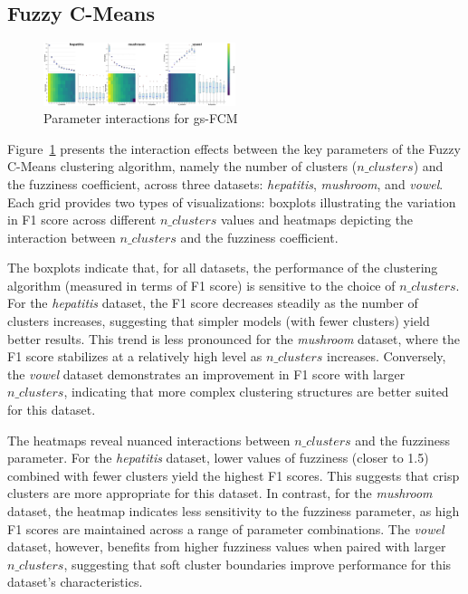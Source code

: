 \subsection{Fuzzy C-Means}
\label{subsec:fuzzycmeansresults}

\begin{figure}[ht!]
    \includegraphics[width=0.5\textwidth]{figures/interactions_fuzzy_cmeans.png}
    \caption{Parameter interactions for gs-FCM}
    \label{fig:interactions_gsfcm}
\end{figure}


Figure~\ref{fig:interactions_gsfcm} presents the interaction effects between the key parameters of the Fuzzy C-Means clustering algorithm, namely the number of clusters ($n\_clusters$) and the fuzziness coefficient, across three datasets: \textit{hepatitis}, \textit{mushroom}, and \textit{vowel}. Each grid provides two types of visualizations: boxplots illustrating the variation in F1 score across different $n\_clusters$ values and heatmaps depicting the interaction between $n\_clusters$ and the fuzziness coefficient.

The boxplots indicate that, for all datasets, the performance of the clustering algorithm (measured in terms of F1 score) is sensitive to the choice of $n\_clusters$. For the \textit{hepatitis} dataset, the F1 score decreases steadily as the number of clusters increases, suggesting that simpler models (with fewer clusters) yield better results. This trend is less pronounced for the \textit{mushroom} dataset, where the F1 score stabilizes at a relatively high level as $n\_clusters$ increases. Conversely, the \textit{vowel} dataset demonstrates an improvement in F1 score with larger $n\_clusters$, indicating that more complex clustering structures are better suited for this dataset.

The heatmaps reveal nuanced interactions between $n\_clusters$ and the fuzziness parameter. For the \textit{hepatitis} dataset, lower values of fuzziness (closer to 1.5) combined with fewer clusters yield the highest F1 scores. This suggests that crisp clusters are more appropriate for this dataset. In contrast, for the \textit{mushroom} dataset, the heatmap indicates less sensitivity to the fuzziness parameter, as high F1 scores are maintained across a range of parameter combinations. The \textit{vowel} dataset, however, benefits from higher fuzziness values when paired with larger $n\_clusters$, suggesting that soft cluster boundaries improve performance for this dataset's characteristics.

